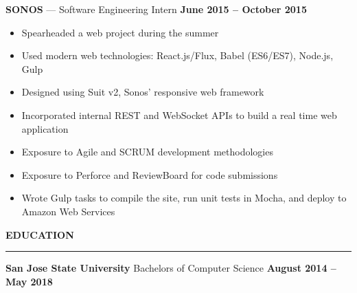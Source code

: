 \documentclass[10pt, oneside]{letter}
\newcommand{\linespaceshit} {
  \vspace{0.05in}
  \hrule
  \vspace{0.05in}
}
\begin{document}
\begin{adjustwidth}{0.1in}{0pt}
\begin{itemize}
          \textbf{SONOS} --- Software Engineering Intern \hfill \textbf{June 2015 -- October 2015}
            \begin{itemize}
              \item Spearheaded a web project during the summer
              \item Used modern web technologies: React.js/Flux, Babel (ES6/ES7), Node.js, Gulp
              \item Designed using Suit v2, Sonos' responsive web framework
              \item Incorporated internal REST and WebSocket APIs to build a real time web application
              \item Exposure to Agile and SCRUM development methodologies
              \item Exposure to Perforce and ReviewBoard for code submissions
              \item Wrote Gulp tasks to compile the site, run unit tests in Mocha, and deploy to Amazon Web Services
            \end{itemize}
      \end{itemize}

    \end{adjustwidth}

  \textbf{EDUCATION}
  \linespaceshit
    \begin{adjustwidth}{0.1in}{0pt}
      \textbf{San Jose State University} \hfill Bachelors of Computer Science \hfill \textbf{August 2014 -- May 2018}
    \end{adjustwidth}
\end{document}
